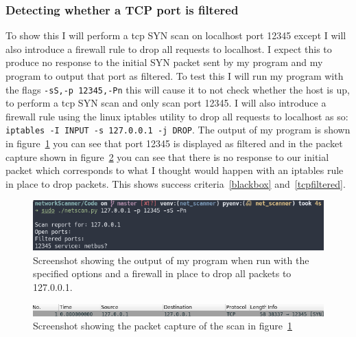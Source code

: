 \documentclass[titlepage]{article}
\let\Oldsubsubsection\subsubsection{}
\renewcommand{\subsubsection}{\FloatBarrier\Oldsubsubsection}
\begin{document}
\subsubsection{Detecting whether a TCP port is filtered}
To show this I will perform a \gls{tcp} SYN scan on localhost port 12345
except I will also introduce a firewall rule to drop all requests to localhost.
I expect this to produce no response to the initial SYN packet sent by my
program and my program to output that port as filtered. To test this I will
run my program with the flags \verb|-sS,-p 12345,-Pn| this will cause it to not
check whether the host is up, to perform a \gls{tcp} SYN scan and only scan port 12345.
I will also introduce a firewall rule using the linux iptables utility to drop
all requests to localhost as so: \verb|iptables -I INPUT -s 127.0.0.1 -j DROP|.
The output of my program is shown in figure~\ref{tcpfilteredoutput} you can
see that port 12345 is displayed as filtered and in the packet capture shown in
figure~\ref{tcpfilteredpcap} you can see that there is no response to our initial packet
which corresponds to what I thought would happen with an iptables rule in place
to drop packets. This shows success criteria~\ref{blackbox} and~\ref{tcpfiltered}.

\begin{figure}[H]
  \centering
  \includegraphics[width=\textwidth]{screenshots/tcpfilteredoutput.png}
  \caption{%
    Screenshot showing the output of my program when run with the specified options
    and a firewall in place to drop all packets to 127.0.0.1.
  }\label{tcpfilteredoutput}
\end{figure}

\begin{figure}[H]
  \centering
  \includegraphics[width=\textwidth]{screenshots/tcpfilteredpcap.png}
  \caption{%
    Screenshot showing the packet capture of the scan in figure~\ref{tcpfilteredoutput}
  }\label{tcpfilteredpcap}
\end{figure}
\end{document}
